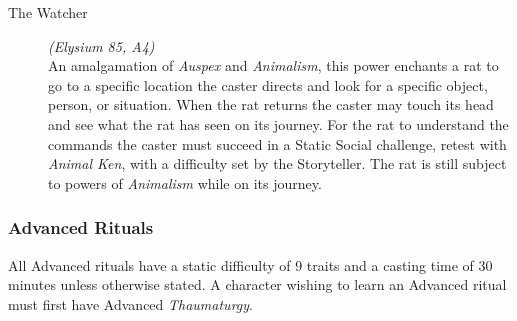 \begin{description}
	\item[The Watcher] \emph{(Elysium 85, A4)} \hfill \\
	An amalgamation of \emph{Auspex} and \emph{Animalism}, this power enchants a rat to go to a specific location the caster directs 
	and look for a specific object, person, or situation.  When the rat returns the caster may touch its head and see what the rat 
	has seen on its journey.  For the rat to understand the commands the caster must succeed in a Static Social challenge, retest 
	with \emph{Animal Ken}, with a difficulty set by the Storyteller.  The rat is still subject to powers of \emph{Animalism} while 
	on its journey. \\
	
\end{description}

\subsubsection{Advanced Rituals}
All Advanced rituals have a static difficulty of 9 traits and a casting time of 30 minutes unless otherwise stated.  
A character wishing to learn an Advanced ritual must first have Advanced \emph{Thaumaturgy}. \\


